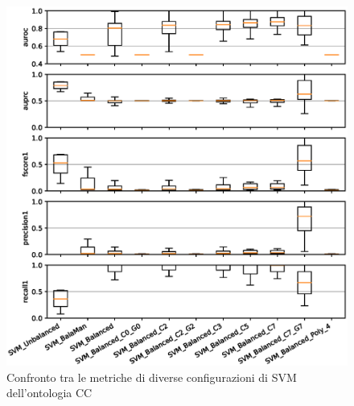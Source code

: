 \documentclass[12pt,a4paper,oneside,hidelinks]{report}
\begin{document}
\begin{figure}[hb]%
    \centering
    \includegraphics[scale = 0.80]{CC-SVM-level1.eps}%
    \caption{Confronto tra le metriche di diverse configurazioni di SVM dell'ontologia CC}%
    \label{figure:liv1.2}%
\end{figure}

\vspace*{\fill}


\vspace*{\fill}
\end{document}

